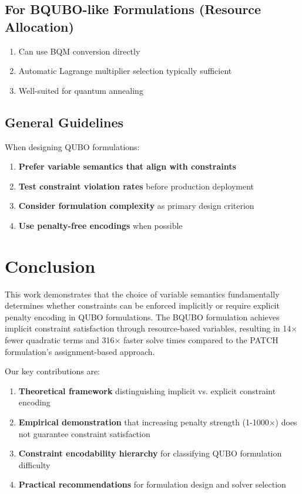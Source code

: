 \documentclass[11pt,a4paper]{article}
\begin{document}
\subsection{For BQUBO-like Formulations (Resource Allocation)}

\begin{enumerate}
    \item Can use BQM conversion directly
    \item Automatic Lagrange multiplier selection typically sufficient
    \item Well-suited for quantum annealing
\end{enumerate}

\subsection{General Guidelines}

When designing QUBO formulations:
\begin{enumerate}
    \item \textbf{Prefer variable semantics that align with constraints}
    \item \textbf{Test constraint violation rates} before production deployment
    \item \textbf{Consider formulation complexity} as primary design criterion
    \item \textbf{Use penalty-free encodings} when possible \cite{sharma2025cutting}
\end{enumerate}

\section{Conclusion}

This work demonstrates that the choice of variable semantics fundamentally determines whether constraints can be enforced implicitly or require explicit penalty encoding in QUBO formulations. The BQUBO formulation achieves implicit constraint satisfaction through resource-based variables, resulting in 14× fewer quadratic terms and 316× faster solve times compared to the PATCH formulation's assignment-based approach.

Our key contributions are:

\begin{enumerate}
    \item \textbf{Theoretical framework} distinguishing implicit vs. explicit constraint encoding
    \item \textbf{Empirical demonstration} that increasing penalty strength (1-1000×) does not guarantee constraint satisfaction
    \item \textbf{Constraint encodability hierarchy} for classifying QUBO formulation difficulty
    \item \textbf{Practical recommendations} for formulation design and solver selection
\end{enumerate}
\end{document}

